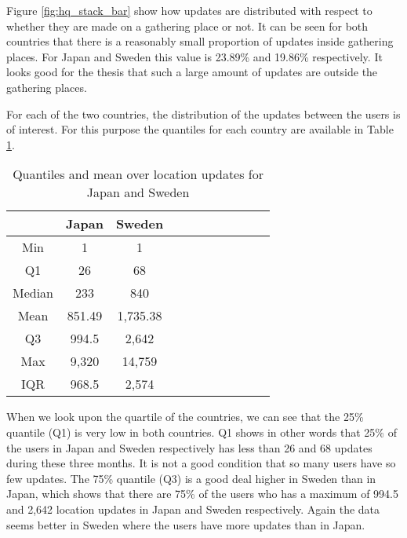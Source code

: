Figure \ref{fig:hq_stack_bar} show how updates are distributed with respect to whether they are made on a gathering place or not. It can be seen for both countries that there is a reasonably small proportion of updates inside gathering places. For Japan and Sweden this value is 23.89\% and 19.86\% respectively. 
It looks good for the thesis that such a large amount of updates are outside the gathering places. 

For each of the two countries, the distribution of the updates between the users is of interest. For this purpose the quantiles for each country are available in Table \ref{tab:stat_loc_updates}. 


\begin{table}[htbp]
        \centering
        \small
        \setlength\tabcolsep{2pt}
        \begin{tabular}{|c|c|c|c|c|c|c|c|c|c|c|}
            \hline
                         & Japan      &   Sweden      \\[-1pt]
            \hline
                 Min     &    1       &   1           \\
            \hline
                 Q1      &  26        &   68      \\
            \hline
                 Median  & 233     &   840      \\
            \hline
                 Mean    &  851.49   &  1,735.38     \\
            \hline
                 Q3      & 994.5    &   2,642     \\
            \hline
                 Max     &  9,320 &  14,759     \\
            \hline
                 IQR     &  968.5   &   2,574     \\
            \hline
            
        \end{tabular}
        \caption{Quantiles and mean over location updates for Japan and Sweden} %
        \label{tab:stat_loc_updates}
\end{table}


When we look upon the quartile of the countries, we can see that the 25\% quantile (Q1) is very low in both countries. Q1 shows in other words that 25\% of the users in Japan and Sweden respectively has less than 26 and 68 updates during these three months. It is not a good condition that so many users have so few updates. The 75\% quantile (Q3) is a good deal higher in Sweden than in Japan, which shows that there are 75\% of the users who has a maximum of 994.5 and 2,642 location updates in Japan and Sweden respectively. Again the data seems better in Sweden where the users have more updates than in Japan. \\ 


